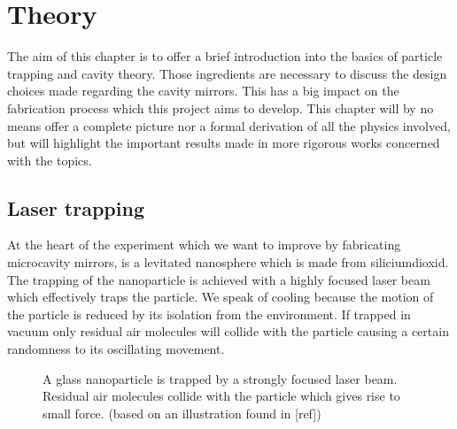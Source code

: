 \chapter{Theory}
The aim of this chapter is to offer a brief introduction into the basics of particle trapping and cavity theory. Those ingredients are necessary to discuss the design choices made regarding the cavity mirrors. This has a big impact on the fabrication process which this project aims to develop. This chapter will by no means offer a complete picture nor a formal derivation of all the physics involved, but will highlight the important results made in more rigorous works concerned with the topics.

\section{Laser trapping}\label{ChapLaserTrapping}
At the heart of the experiment which we want to improve by fabricating microcavity mirrors, is a levitated nanosphere which is made from siliciumdioxid. The trapping of the nanoparticle is achieved with a highly focused laser beam which effectively traps the particle. We speak of cooling because the motion of the particle is reduced by its isolation from the environment. If trapped in vacuum only residual air molecules will collide with the particle causing a certain randomness to its oscillating movement.

\begin{figure}[H]
	
	\caption{A glass nanoparticle is trapped by a strongly focused laser beam. Residual air molecules collide with the particle which gives rise to small force. (based on an illustration found in [ref])}
\end{figure}

